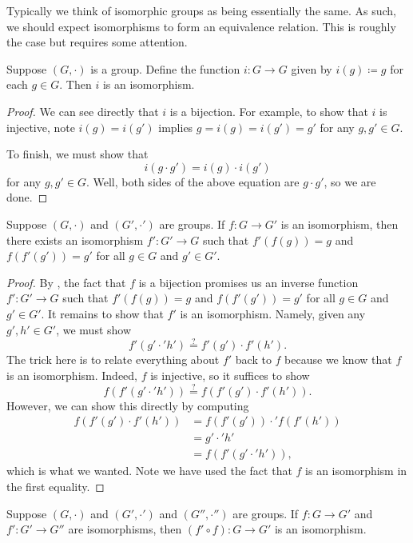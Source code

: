 \documentclass[../notes.tex]{subfiles}
\begin{document}
Typically we think of isomorphic groups as being essentially the same. As such, we should expect isomorphisms to form an equivalence relation. This is roughly the case but requires some attention.
\begin{lemma} \label{lem:id-is-iso}
    Suppose $(G,\cdot)$ is a group. Define the function $i\colon G\to G$ given by $i(g)\coloneqq g$ for each $g\in G$. Then $i$ is an isomorphism.
\end{lemma}
\begin{proof}
    We can see directly that $i$ is a bijection. For example, to show that $i$ is injective, note $i(g)=i(g')$ implies $g=i(g)=i(g')=g'$ for any $g,g'\in G$.
    
    To finish, we must show that
    \[i(g\cdot g')=i(g)\cdot i(g')\]
    for any $g,g'\in G$. Well, both sides of the above equation are $g\cdot g'$, so we are done.
\end{proof}
\begin{lemma} \label{lem:inv-iso}
    Suppose $(G,\cdot)$ and $(G',\cdot')$ are groups. If $f\colon G\to G'$ is an isomorphism, then there exists an isomorphism $f'\colon G'\to G$ such that $f'(f(g))=g$ and $f(f'(g'))=g'$ for all $g\in G$ and $g'\in G'$.
\end{lemma}
\begin{proof}
    By , the fact that $f$ is a bijection promises us an inverse function $f'\colon G'\to G$ such that $f'(f(g))=g$ and $f(f'(g'))=g'$ for all $g\in G$ and $g'\in G'$. It remains to show that $f'$ is an isomorphism. Namely, given any $g',h'\in G'$, we must show
    \[f'(g'\cdot'h')\stackrel?=f'(g')\cdot f'(h').\]
    The trick here is to relate everything about $f'$ back to $f$ because we know that $f$ is an isomorphism. Indeed, $f$ is injective, so it suffices to show
    \[f(f'(g'\cdot'h'))\stackrel?=f(f'(g')\cdot f'(h')).\]
    However, we can show this directly by computing
    \begin{align*}
        f(f'(g')\cdot f'(h')) &= f(f'(g'))\cdot'f(f'(h')) \\
        &= g'\cdot'h' \\
        &= f(f'(g'\cdot'h')),
    \end{align*}
    which is what we wanted. Note we have used the fact that $f$ is an isomorphism in the first equality.
\end{proof}
\begin{lemma} \label{lem:comp-iso}
    Suppose $(G,\cdot)$ and $(G',\cdot')$ and $(G'',\cdot'')$ are groups. If $f\colon G\to G'$ and $f'\colon G'\to G''$ are isomorphisms, then $(f'\circ f)\colon G\to G'$ is an isomorphism.
\end{lemma}
\end{document}
